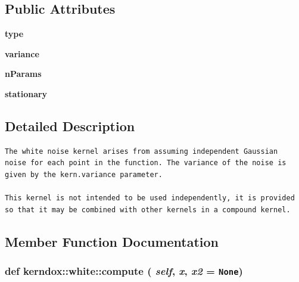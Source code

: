 \subsection*{Public Attributes}
\begin{CompactItemize}
\item 
\hypertarget{classkerndox_1_1white_d1f783449701904d62871311f470aaf5}{
\textbf{type}}
\label{classkerndox_1_1white_d1f783449701904d62871311f470aaf5}

\item 
\hypertarget{classkerndox_1_1white_29b711e2e7f9870fc34254399c2ad990}{
\textbf{variance}}
\label{classkerndox_1_1white_29b711e2e7f9870fc34254399c2ad990}

\item 
\hypertarget{classkerndox_1_1white_3636bb9a4884db30440b07aa34fa1c89}{
\textbf{nParams}}
\label{classkerndox_1_1white_3636bb9a4884db30440b07aa34fa1c89}

\item 
\hypertarget{classkerndox_1_1white_c4fdeddebe2980f0f87f4801eb0c777f}{
\textbf{stationary}}
\label{classkerndox_1_1white_c4fdeddebe2980f0f87f4801eb0c777f}

\end{CompactItemize}


\subsection{Detailed Description}


\footnotesize\begin{verbatim}The white noise kernel arises from assuming independent Gaussian
noise for each point in the function. The variance of the noise is
given by the kern.variance parameter.

This kernel is not intended to be used independently, it is provided
so that it may be combined with other kernels in a compound kernel.\end{verbatim}
\normalsize
 

\subsection{Member Function Documentation}
\hypertarget{classkerndox_1_1white_805a650c553ae690536aa1000a2250e9}{
\subsubsection[{compute}]{\setlength{\rightskip}{0pt plus 5cm}def kerndox::white::compute ( {\em self}, \/   {\em x}, \/   {\em x2} = {\tt None})}}
\label{classkerndox_1_1white_805a650c553ae690536aa1000a2250e9}




